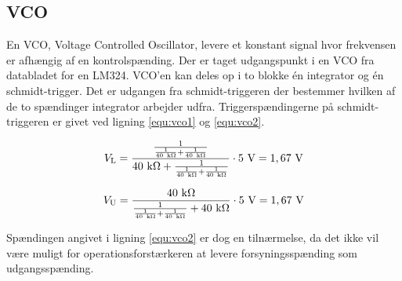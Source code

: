 \subsection{VCO}
\label{volumenkontrol-simulering-vco}

En VCO, Voltage Controlled Oscillator, levere et konstant signal hvor frekvensen er afhængig af en kontrolspænding. Der er taget udgangspunkt i en VCO fra databladet for en LM324. VCO'en kan deles op i to blokke én integrator og én schmidt-trigger. Det er udgangen fra schmidt-triggeren der bestemmer hvilken af de to spændinger integrator arbejder udfra. Triggerspændingerne på schmidt-triggeren er givet ved ligning \ref{equ:vco1} og \ref{equ:vco2}.

\begin{equation}
\label{equ:vco1}
V_\mathrm{L} = \mathrm{\frac{\frac{1}{\frac{1}{40~k\ohm} + \frac{1}{40~k\ohm}}}{40~k\ohm + \frac{1}{\frac{1}{40~k\ohm} + \frac{1}{40~k\ohm}}} \cdot 5~V = 1,67~V}
\end{equation}

\begin{equation}
\label{equ:vco2}
V_\mathrm{U} = \mathrm{\frac{40~k\ohm}{\frac{1}{\frac{1}{40~k\ohm} + \frac{1}{40~k\ohm}} + 40~k\ohm} \cdot 5~V = 1,67~V}
\end{equation}

Spændingen angivet i ligning \ref{equ:vco2} er dog en tilnærmelse, da det ikke vil være muligt for operationsforstærkeren at levere forsyningsspænding som udgangsspænding.